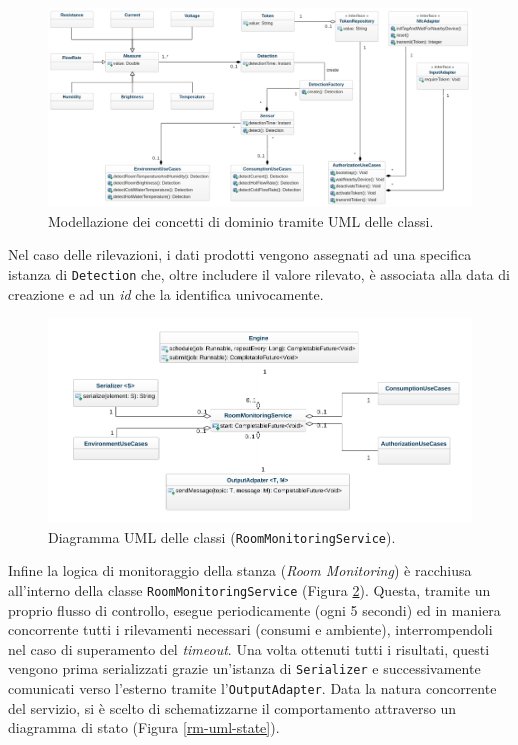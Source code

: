 \begin{figure}[H]
    \centering
    \hspace*{-1.5cm}\includegraphics[width=1.2\textwidth]{images/cu-uml.png}\hfill
    \caption{\label{cu-uml}Modellazione dei concetti di dominio tramite UML delle classi.}
\end{figure}
Nel caso delle rilevazioni, i dati prodotti vengono assegnati ad una specifica istanza di \texttt{Detection} che, oltre includere il valore rilevato, è associata alla data di creazione e ad un \textit{id} che la identifica univocamente. 
%
\begin{figure}[H]
    \centering
    \hspace*{-1.5cm}\includegraphics[width=1.17\textwidth]{images/room-monitoring-serivce.png}\hfill
    \caption{\label{rm-uml}Diagramma UML delle classi (\texttt{RoomMonitoringService}).}
\end{figure}
%
Infine la logica di monitoraggio della stanza (\textit{Room Monitoring}) è racchiusa all'interno della classe \texttt{RoomMonitoringService} (Figura \ref*{rm-uml}). Questa, tramite un proprio flusso di controllo, esegue periodicamente (ogni 5 secondi) ed in maniera concorrente tutti i rilevamenti necessari (consumi e ambiente), interrompendoli nel caso di superamento del \textit{timeout}. Una volta ottenuti tutti i risultati, questi vengono prima serializzati grazie un'istanza di \texttt{Serializer} e successivamente comunicati verso l'esterno tramite l'\texttt{OutputAdapter}. Data la natura concorrente del servizio, si è scelto di schematizzarne il comportamento attraverso un diagramma di stato (Figura \ref*{rm-uml-state}).

